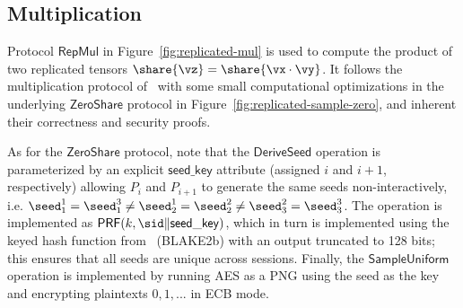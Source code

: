 \subsection{Multiplication}

Protocol $\mathsf{RepMul}$ in Figure~\ref{fig:replicated-mul} is used to compute the product of two replicated tensors $\share{\vz} = \share{\vx \cdot \vy}$. It follows the multiplication protocol of~\cite{CCS:AFLNO16} with some small computational optimizations in the underlying $\mathsf{ZeroShare}$ protocol in Figure~\ref{fig:replicated-sample-zero}, and inherent their correctness and security proofs.

As for the $\mathsf{ZeroShare}$ protocol, note that the $\mathsf{DeriveSeed}$ operation is parameterized by an explicit $\mathsf{seed\_key}$ attribute (assigned $i$ and $i+1$, respectively) allowing $P_i$ and $P_{i+1}$ to generate the same seeds non-interactively, i.e. $\seed^1_1 = \seed^3_1 \not = \seed^1_2 = \seed^2_2 \not = \seed^2_3 = \seed^3_3$. The operation is implemented as $\mathsf{PRF}(k, \sid \| \mathsf{seed\_key})$, which in turn is implemented using the keyed hash function from~\cite{libsodium} (BLAKE2b) with an output truncated to 128 bits; this ensures that all seeds are unique across sessions. Finally, the $\mathsf{SampleUniform}$ operation is implemented by running AES as a PNG using the seed as the key and encrypting plaintexts $0, 1, ...$ in ECB mode.

